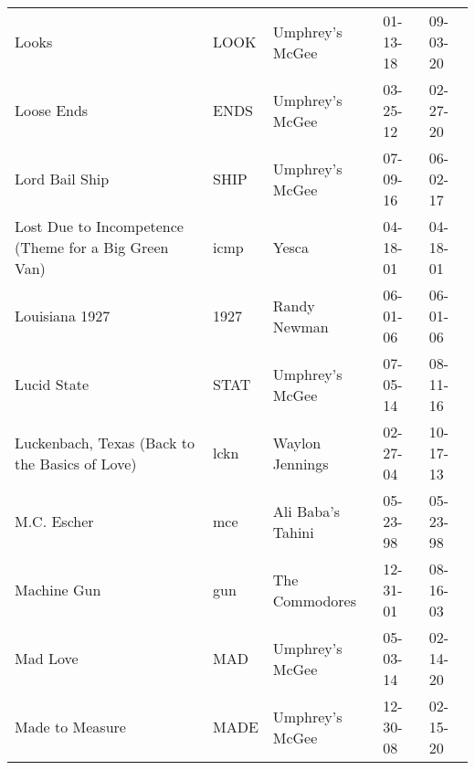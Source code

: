 \begin{longtable}{p{}p{}p{}p{}p{}}
                                                                   Looks &          LOOK &                                          Umphrey's McGee &              01-13-18 &             09-03-20 \\
                                                              Loose Ends &          ENDS &                                          Umphrey's McGee &              03-25-12 &             02-27-20 \\
                                                          Lord Bail Ship &          SHIP &                                          Umphrey's McGee &              07-09-16 &             06-02-17 \\
                    Lost Due to Incompetence (Theme for a Big Green Van) &          icmp &                                                    Yesca &              04-18-01 &             04-18-01 \\
                                                          Louisiana 1927 &          1927 &                                             Randy Newman &              06-01-06 &             06-01-06 \\
                                                             Lucid State &          STAT &                                          Umphrey's McGee &              07-05-14 &             08-11-16 \\
                          Luckenbach, Texas (Back to the Basics of Love) &          lckn &                                          Waylon Jennings &              02-27-04 &             10-17-13 \\
                                                             M.C. Escher &           mce &                                        Ali Baba's Tahini &              05-23-98 &             05-23-98 \\
                                                             Machine Gun &           gun &                                           The Commodores &              12-31-01 &             08-16-03 \\
                                                                Mad Love &           MAD &                                          Umphrey's McGee &              05-03-14 &             02-14-20 \\
                                                         Made to Measure &          MADE &                                          Umphrey's McGee &              12-30-08 &             02-15-20 \\

\end{longtable}
